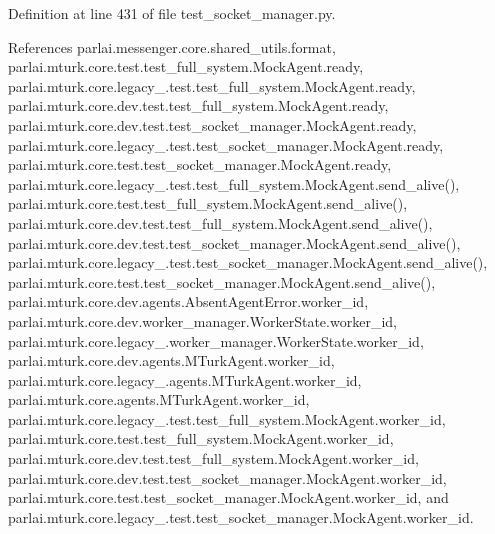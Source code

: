 Definition at line 431 of file test\+\_\+socket\+\_\+manager.\+py.



References parlai.\+messenger.\+core.\+shared\+\_\+utils.\+format, parlai.\+mturk.\+core.\+test.\+test\+\_\+full\+\_\+system.\+Mock\+Agent.\+ready, parlai.\+mturk.\+core.\+legacy\+\_.\+test.\+test\+\_\+full\+\_\+system.\+Mock\+Agent.\+ready, parlai.\+mturk.\+core.\+dev.\+test.\+test\+\_\+full\+\_\+system.\+Mock\+Agent.\+ready, parlai.\+mturk.\+core.\+dev.\+test.\+test\+\_\+socket\+\_\+manager.\+Mock\+Agent.\+ready, parlai.\+mturk.\+core.\+legacy\+\_.\+test.\+test\+\_\+socket\+\_\+manager.\+Mock\+Agent.\+ready, parlai.\+mturk.\+core.\+test.\+test\+\_\+socket\+\_\+manager.\+Mock\+Agent.\+ready, parlai.\+mturk.\+core.\+legacy\+\_.\+test.\+test\+\_\+full\+\_\+system.\+Mock\+Agent.\+send\+\_\+alive(), parlai.\+mturk.\+core.\+test.\+test\+\_\+full\+\_\+system.\+Mock\+Agent.\+send\+\_\+alive(), parlai.\+mturk.\+core.\+dev.\+test.\+test\+\_\+full\+\_\+system.\+Mock\+Agent.\+send\+\_\+alive(), parlai.\+mturk.\+core.\+dev.\+test.\+test\+\_\+socket\+\_\+manager.\+Mock\+Agent.\+send\+\_\+alive(), parlai.\+mturk.\+core.\+legacy\+\_.\+test.\+test\+\_\+socket\+\_\+manager.\+Mock\+Agent.\+send\+\_\+alive(), parlai.\+mturk.\+core.\+test.\+test\+\_\+socket\+\_\+manager.\+Mock\+Agent.\+send\+\_\+alive(), parlai.\+mturk.\+core.\+dev.\+agents.\+Absent\+Agent\+Error.\+worker\+\_\+id, parlai.\+mturk.\+core.\+dev.\+worker\+\_\+manager.\+Worker\+State.\+worker\+\_\+id, parlai.\+mturk.\+core.\+legacy\+\_.\+worker\+\_\+manager.\+Worker\+State.\+worker\+\_\+id, parlai.\+mturk.\+core.\+dev.\+agents.\+M\+Turk\+Agent.\+worker\+\_\+id, parlai.\+mturk.\+core.\+legacy\+\_.\+agents.\+M\+Turk\+Agent.\+worker\+\_\+id, parlai.\+mturk.\+core.\+agents.\+M\+Turk\+Agent.\+worker\+\_\+id, parlai.\+mturk.\+core.\+legacy\+\_.\+test.\+test\+\_\+full\+\_\+system.\+Mock\+Agent.\+worker\+\_\+id, parlai.\+mturk.\+core.\+test.\+test\+\_\+full\+\_\+system.\+Mock\+Agent.\+worker\+\_\+id, parlai.\+mturk.\+core.\+dev.\+test.\+test\+\_\+full\+\_\+system.\+Mock\+Agent.\+worker\+\_\+id, parlai.\+mturk.\+core.\+dev.\+test.\+test\+\_\+socket\+\_\+manager.\+Mock\+Agent.\+worker\+\_\+id, parlai.\+mturk.\+core.\+test.\+test\+\_\+socket\+\_\+manager.\+Mock\+Agent.\+worker\+\_\+id, and parlai.\+mturk.\+core.\+legacy\+\_.\+test.\+test\+\_\+socket\+\_\+manager.\+Mock\+Agent.\+worker\+\_\+id.

